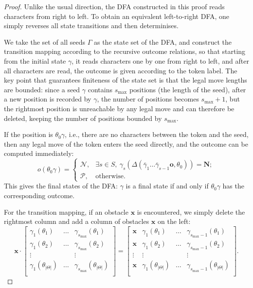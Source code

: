 \documentclass[11pt]{article}
\theoremstyle{definition}
\theoremstyle{plain}
\newcommand{\varP}{\mathcal{P}}
\newcommand{\varN}{\mathcal{N}}
\newcommand{\rmN}{\mathbf{N}}
\newcommand{\x}{\mathbf{x}}
\newcommand{\e}{\mathbf{o}}
\begin{document}
\begin{proof}
    Unlike the usual direction, the DFA constructed in this proof reads characters from right to left.
    To obtain an equivalent left-to-right DFA, one simply reverses all state transitions and then determinises.

    We take the set of all seeds $\varGamma$ as the state set of the DFA, and construct the transition mapping according to the recursive outcome relations,
    so that starting from the initial state $\gamma$, it reads characters one by one from right to left, and after all characters are read, the outcome is given according to the token label.
    The key point that guarantees finiteness of the state set is that the legal move lengths are bounded:
    since a seed $\gamma$ contains $s_{\max}$ positions (the length of the seed), after a new position is recorded by $\gamma$, the number of positions becomes $s_{\max}+1$, but the rightmost position is unreachable by any legal move and can therefore be deleted, keeping the number of positions bounded by $s_{\max}$.

    If the position is $\theta_0\gamma$, i.e., there are no characters between the token and the seed, then any legal move of the token enters the seed directly, and the outcome can be computed immediately:
    \[
        o(\theta_0\gamma) =
        \begin{cases}
            \varN, & \exists s\in S,\ \gamma_s(\varDelta(\bar{\gamma}_{1}\ldots\bar{\gamma}_{s-1}\e ,\theta_0)) = \rmN; \\
            \varP, & \text{otherwise}.
        \end{cases}
    \]
    This gives the final states of the DFA: $\gamma$ is a final state if and only if $\theta_0\gamma$ has the corresponding outcome.

    For the transition mapping, if an obstacle $\x$ is encountered, we simply delete the rightmost column and add a column of obstacles $\x$ on the left:
    \[
        \x\cdot
        \begin{bmatrix}
            \gamma_1(\theta_1) & \ldots & \gamma_{s_{\max}}(\theta_1) \\
            \gamma_1(\theta_2) & \ldots & \gamma_{s_{\max}}(\theta_2) \\
            \vdots & & \vdots \\
            \gamma_1(\theta_{|\varTheta|}) & \ldots & \gamma_{s_{\max}}(\theta_{|\varTheta|}) \\
        \end{bmatrix}
        =
        \begin{bmatrix}
            \x & \gamma_1(\theta_1) & \ldots & \gamma_{s_{\max}-1}(\theta_1) \\
            \x & \gamma_1(\theta_2) & \ldots & \gamma_{s_{\max}-1}(\theta_2) \\
            \vdots & \vdots & & \vdots \\
            \x & \gamma_1(\theta_{|\varTheta|}) & \ldots & \gamma_{s_{\max}-1}(\theta_{|\varTheta|}) \\
        \end{bmatrix}.
    \]


\end{proof}
\end{document}
